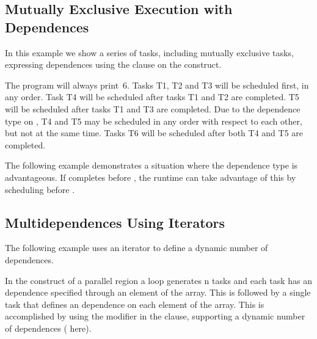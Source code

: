 

\pagebreak
\subsection{Mutually Exclusive Execution with Dependences}
\label{subsec:task_dep_mutexinoutset}

In this example we show a series of tasks, including mutually exclusive
tasks, expressing dependences using the  clause on the
 construct.

The program will always print~6. Tasks T1, T2 and T3 will be scheduled first,
in any order. Task T4 will be scheduled after tasks T1 and T2 are
completed. T5 will be scheduled after tasks T1 and T3 are completed. Due
to the  dependence type on , T4 and T5 may be
scheduled in any order with respect to each other, but not at the same
time. Tasks T6 will be scheduled after both T4 and T5 are completed.



The following example demonstrates a situation where the 
dependence type is advantageous. If  completes
before , the runtime can take advantage of this by
scheduling  before .



\subsection{Multidependences Using Iterators}
\label{subsec:depend_iterator}

The following example uses an iterator to define a dynamic number of
dependences.

In the  construct of a parallel region a loop generates n tasks
and each task has an  dependence specified through an element of
the  array.  This is followed by a single task that defines an 
dependence on each element of the array.  This is accomplished by
using the  modifier in the  clause, supporting a dynamic number
of dependences ( here).

